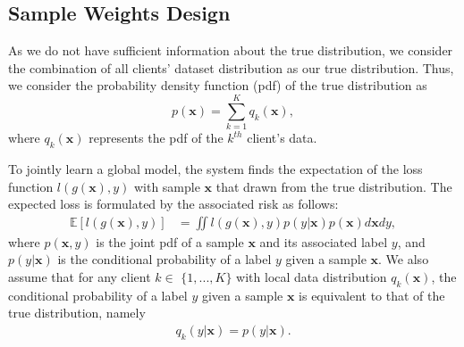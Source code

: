 \documentclass[mathfont=newtx]{uai2023} %
\newcommand{\x}{\mathbf{x}}
\begin{document}
\subsection{Sample Weights Design}
As we do not have sufficient information about the true distribution, we consider the combination of all clients' dataset distribution as our true distribution. Thus, we consider the probability density function (pdf) of the true distribution as 
\begin{equation}
\label{eq:sumdist}
	 p(\mathbf{x}) = \sum_{k=1}^{K}q_k(\mathbf{x}) ,
\end{equation}
where $q_k(\mathbf{x})$ represents the pdf of the $k^{th}$ client's data. 

To jointly learn a global model, the system finds the expectation of the loss function $l(g(\mathbf{x}),y)$ with sample $\x{}$ that drawn from the true distribution. The expected loss is formulated by the associated risk \cite{noauthor_empirical_2021} as follows:
\begin{align}
	\mathbb{E}[l(g(\mathbf{x}),y)] 
	&= \iint l(g(\mathbf{x}),y) p(y|\mathbf{\mathbf{x}}) p(\mathbf{x}) d\mathbf{x}dy, \label{eq:risk} 
\end{align}
where $p(\mathbf{x},y)$ is the joint pdf of a sample $\mathbf{x}$ and its associated label $y$, and $p(y|\mathbf{x})$ is the conditional probability of a label $y$ given a sample $\mathbf{x}$. We also assume that for any client $k \in$ $\{1,...,K\}$ with local data distribution $q_k(\mathbf{x})$, the conditional probability of a label $y$ given a sample $\mathbf{x}$ is equivalent to that of the true distribution, namely
\begin{align}
	\label{eq:assumtion}
	 q_k(y|\mathbf{x}) = p(y|\mathbf{x}).
\end{align}
\end{document}
